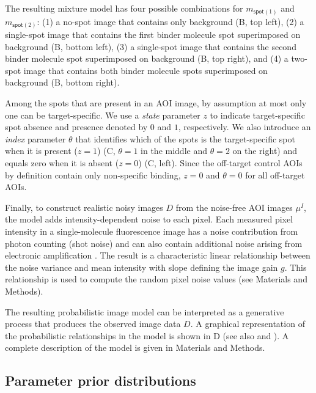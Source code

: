 The resulting mixture model has four possible combinations for $m_{\mathsf{spot}(1)}$ and $m_{\mathsf{spot}(2)}$: (1) a no-spot image that contains only background (B, top left), (2) a single-spot image that contains the first binder molecule spot superimposed on background (B, bottom left), (3) a single-spot image that contains the second binder molecule spot superimposed on background (B, top right), and (4) a two-spot image that contains both binder molecule spots superimposed on background (B, bottom right).

Among the spots that are present in an AOI image, by assumption at most only one can be target-specific. We use a \emph{state} parameter $z$ to indicate target-specific spot absence and presence denoted by $0$ and $1$, respectively. We also introduce an \emph{index} parameter $\theta$ that identifies which of the spots is the target-specific spot  when it is present ($z = 1$) (C, $\theta = 1$ in the middle and $\theta = 2$ on the right) and equals zero when it is absent ($z = 0$) (C, left). Since the off-target control AOIs by definition contain only non-specific binding, $z = 0$ and $\theta = 0$ for all off-target AOIs. 

Finally, to construct realistic noisy images $D$ from the noise-free AOI images $\mu^I$, the model adds intensity-dependent noise to each pixel.  Each measured pixel intensity in a single-molecule fluorescence image has a noise contribution from photon counting (shot noise) and can also contain additional noise arising from electronic amplification \citep{Van_Vliet1998-jk}. The result is a characteristic linear relationship between the noise variance and mean intensity with slope defining the image gain $g$. This relationship is used to compute the random pixel noise values (see Materials and Methods).

The resulting probabilistic image model can be interpreted as a generative process that produces the observed image data $D$. A graphical representation of the probabilistic relationships in the model is shown in D (see also  and ). A complete description of the model is given in Materials and Methods.  



\subsection{Parameter prior distributions}

